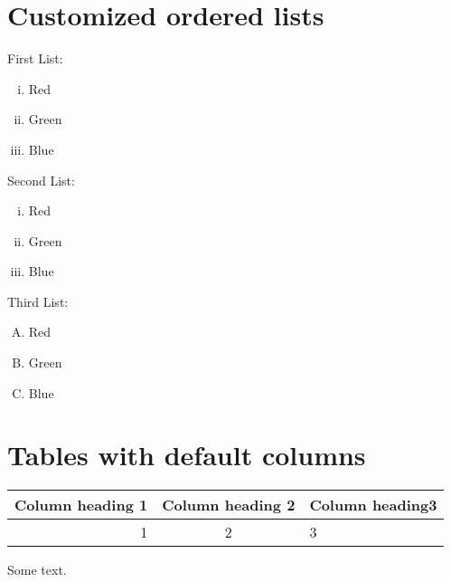 \documentclass{article}
\begin{document}
\section{Customized ordered lists}
First List:
\begin{enumerate}[i.] %
  \item Red
  \item Green
  \item Blue
\end{enumerate}

Second List:
\begin{enumerate}[i)] %
  \item Red
  \item Green
  \item Blue
\end{enumerate}

Third List:
\begin{enumerate}[A)] %
  \item Red
  \item Green
  \item Blue
\end{enumerate}

\section{Tables with default columns}
\begin{tabular}{ |r| c l } %
  \hline %
  Column heading 1 & Column heading 2 & Column heading3 \\ %
  \hline
  \hline %
  1 & 2 & 3
\end{tabular}
Some text.
\end{document}
